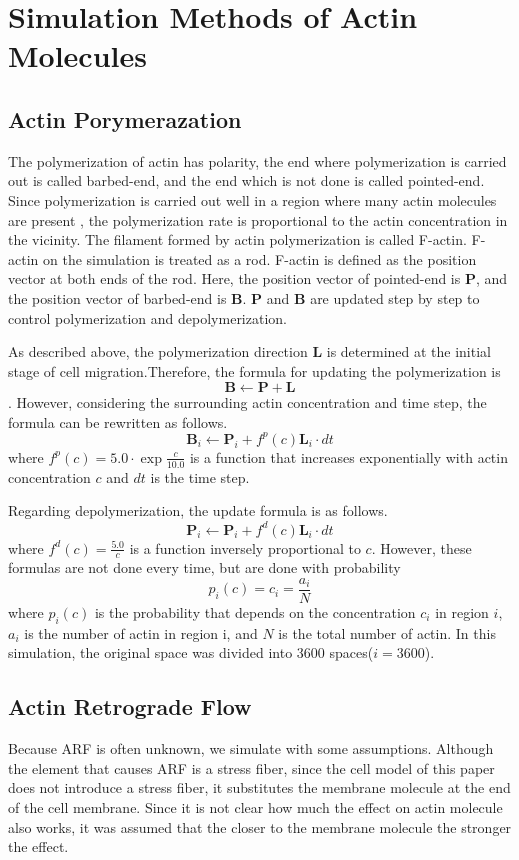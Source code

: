\documentclass[a4paper,12pt]{book}
\begin{document}
\section{Simulation Methods of Actin Molecules}
\subsection{Actin Porymerazation}
The polymerization of actin has polarity, the end where polymerization is carried out is called barbed-end, and the end which is not done is called pointed-end. Since polymerization is carried out well in a region where many actin molecules are present , the polymerization rate is proportional to the actin concentration in the vicinity.  The filament formed by actin polymerization is called F-actin. F-actin on the simulation is treated as a rod. F-actin is defined as the position vector at both ends of the rod. Here, the position vector of pointed-end is $\bm{P}$, and the position vector of barbed-end is $\bm{B}$. $\bm{P}$ and $\bm{B}$ are updated step by step to control polymerization and depolymerization.

As described above, the polymerization direction $\bm{L}$ is determined at the initial stage of cell migration.Therefore, the formula for updating the polymerization is \[\bm{B} \gets \bm{P} + \bm{L}\]. However, considering the surrounding actin concentration and time step, the formula can be rewritten as follows.
\begin{equation}
\bm{B}_i \gets \bm{P}_i + f^p(c)\bm{L}_i \cdot dt
\end{equation}
where $f^p(c) = 5.0 \cdot \exp{\frac{c}{10.0}}$ is a function that  increases exponentially with actin concentration $c$ and $dt$ is the time step.

Regarding depolymerization, the update formula is as follows.
\begin{equation}
\bm{P}_i \gets \bm{P}_i + f^d(c)\bm{L}_i \cdot dt
\end{equation}
where  $f^d(c) = \frac{5.0}{c}$ is a function inversely proportional to $c$. However, these formulas are not done every time, but are done with probability \[p_i(c) = c_i = \frac{a_i}{N}\] where $p_i(c)$ is the probability that depends on the concentration $c_i$ in region $i$, $a_i$ is the number of actin in region i, and $N$ is the total number of actin. In this simulation, the original space was divided into 3600 spaces($i=3600$).



\subsection{Actin Retrograde Flow}
Because ARF is often unknown, we simulate with some assumptions. Although the element that causes ARF is a stress fiber, since the cell model of this paper does not introduce a stress fiber, it substitutes the membrane molecule at the end of the cell membrane. Since it is not clear how much the effect on actin molecule also works, it was assumed that the closer to the membrane molecule the stronger the effect.
\end{document}
